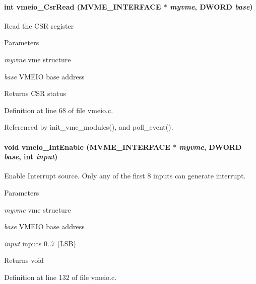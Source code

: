 \paragraph[{vmeio\_\-CsrRead}]{\setlength{\rightskip}{0pt plus 5cm}int vmeio\_\-CsrRead ({\bf MVME\_\-INTERFACE} $\ast$ {\em myvme}, \/  {\bf DWORD} {\em base})}\hfill\label{vmeio_8h_a25961e0bc69e5694ead08873b6af0a11}
Read the CSR register 
\begin{DoxyParams}{Parameters}
\item[{\em myvme}]vme structure \item[{\em base}]VMEIO base address \end{DoxyParams}
\begin{DoxyReturn}{Returns}
CSR status 
\end{DoxyReturn}


Definition at line 68 of file vmeio.c.

Referenced by init\_\-vme\_\-modules(), and poll\_\-event().
\paragraph[{vmeio\_\-IntEnable}]{\setlength{\rightskip}{0pt plus 5cm}void vmeio\_\-IntEnable ({\bf MVME\_\-INTERFACE} $\ast$ {\em myvme}, \/  {\bf DWORD} {\em base}, \/  int {\em input})}\hfill\label{vmeio_8h_a435b8c9a42cccfa95a10ae2b6030f416}
Enable Interrupt source. Only any of the first 8 inputs can generate interrupt. 
\begin{DoxyParams}{Parameters}
\item[{\em myvme}]vme structure \item[{\em base}]VMEIO base address \item[{\em input}]inputs 0..7 (LSB) \end{DoxyParams}
\begin{DoxyReturn}{Returns}
void 
\end{DoxyReturn}


Definition at line 132 of file vmeio.c.
